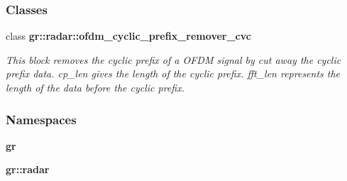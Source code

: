 \subsubsection*{Classes}
\begin{DoxyCompactItemize}
\item 
class {\bf gr\+::radar\+::ofdm\+\_\+cyclic\+\_\+prefix\+\_\+remover\+\_\+cvc}
\begin{DoxyCompactList}\small\item\em This block removes the cyclic prefix of a O\+F\+DM signal by cut away the cyclic prefix data. cp\+\_\+len gives the length of the cyclic prefix. fft\+\_\+len represents the length of the data before the cyclic prefix. \end{DoxyCompactList}\end{DoxyCompactItemize}
\subsubsection*{Namespaces}
\begin{DoxyCompactItemize}
\item 
 {\bf gr}
\item 
 {\bf gr\+::radar}
\end{DoxyCompactItemize}

